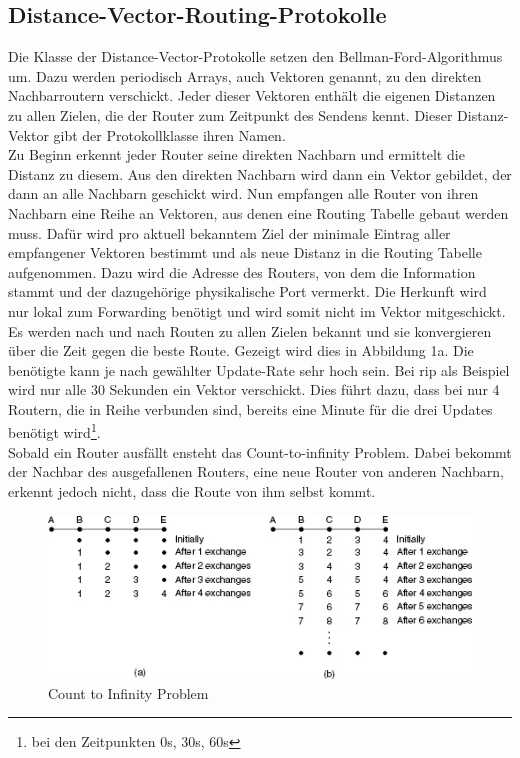 \documentclass[1pt,a4paper,final]{article}
\begin{document}
\subsection{Distance-Vector-Routing-Protokolle}
Die Klasse der Distance-Vector-Protokolle setzen den Bellman-Ford-Algorithmus um. Dazu werden periodisch Arrays, auch Vektoren genannt, zu den direkten Nachbarroutern verschickt. Jeder dieser Vektoren enthält die eigenen Distanzen zu allen Zielen, die der Router zum Zeitpunkt des Sendens kennt. Dieser Distanz-Vektor gibt der Protokollklasse ihren Namen. \\
Zu Beginn erkennt jeder Router seine direkten Nachbarn und ermittelt die Distanz zu diesem. Aus den direkten Nachbarn wird dann ein Vektor gebildet, der dann an alle Nachbarn geschickt wird. Nun empfangen alle Router von ihren Nachbarn eine Reihe an Vektoren, aus denen eine Routing Tabelle gebaut werden muss. Dafür wird pro aktuell bekanntem Ziel der minimale Eintrag aller empfangener Vektoren bestimmt und als neue Distanz in die Routing Tabelle aufgenommen. Dazu wird die Adresse des Routers, von dem die Information stammt und der dazugehörige physikalische Port vermerkt. Die Herkunft wird nur lokal zum Forwarding benötigt und wird somit nicht im Vektor mitgeschickt.\\
Es werden nach und nach Routen zu allen Zielen bekannt und sie konvergieren über die Zeit gegen die beste Route. Gezeigt wird dies in Abbildung 1a. Die benötigte kann je nach gewählter Update-Rate sehr hoch sein. Bei \ac{rip} als Beispiel wird nur alle 30 Sekunden ein Vektor verschickt. Dies führt dazu, dass bei nur 4 Routern, die in Reihe verbunden sind, bereits eine Minute für  die drei Updates benötigt wird\footnote{bei den Zeitpunkten 0s, 30s, 60s}.\\
Sobald ein Router ausfällt ensteht das Count-to-infinity Problem. Dabei bekommt der Nachbar des ausgefallenen Routers, eine neue Router von anderen Nachbarn, erkennt jedoch nicht, dass die Route von ihm selbst kommt.\\
\begin{figure}[h]
\includegraphics[width=1.0\textwidth]{images/count_to_inf.png}
\caption[count to inf]{Count to Infinity Problem\footnotemark}
\label{count_to_inf}
\end{figure}
\end{document}
